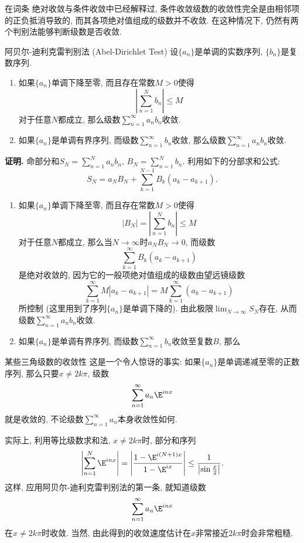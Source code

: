 

在词条 绝对收敛与条件收敛中已经解释过, 条件收敛级数的收敛性完全是由相邻项的正负抵消导致的, 而其各项绝对值组成的级数并不收敛. 在这种情况下, 仍然有两个判别法能够判断级数是否收敛.

\begin{theorem}{阿贝尔-迪利克雷判别法 (Abel-Dirichlet Test)}
设$\{a_n\}$是单调的实数序列, $\{b_n\}$是复数序列.

\begin{enumerate}
\item 如果$\{a_n\}$单调下降至零, 而且存在常数$M>0$使得
$$
\left|\sum_{n=1}^N b_n\right|\leq M
$$
对于任意$N$都成立, 那么级数$\sum_{n=1}^\infty a_nb_n$收敛.

\item 如果$\{a_n\}$是单调有界序列, 而级数$\sum_{n=1}^\infty b_n$收敛, 那么级数$\sum_{n=1}^\infty a_nb_n$收敛.
\end{enumerate}
\end{theorem}

\textbf{证明.} 命部分和$S_N=\sum_{n=1}^N a_nb_n$, $B_N=\sum_{n=1}^N b_n$. 利用如下的分部求和公式:
$$
S_N=a_NB_N+\sum_{k=1}^{N-1}B_k(a_{k}-a_{k+1}).
$$

\begin{enumerate}
\item 如果$\{a_n\}$单调下降至零, 而且存在常数$M>0$使得
$$
|B_N|=\left|\sum_{n=1}^N b_n\right|\leq M
$$
对于任意$N$都成立, 那么当$N\to\infty$时$a_NB_N\to0$, 而级数
$$
\sum_{k=1}^{\infty}B_k(a_{k}-a_{k+1})
$$
是绝对收敛的, 因为它的一般项绝对值组成的级数由望远镜级数
$$
\sum_{k=1}^{\infty}M|a_{k}-a_{k+1}|
=M\sum_{k=1}^{\infty}(a_{k}-a_{k+1})
$$
所控制 (这里用到了序列$\{a_n\}$是单调下降的). 由此极限$\lim_{N\to\infty}S_N$存在, 从而级数$\sum_{n=1}^\infty a_nb_n$收敛.

\item 如果$\{a_n\}$是单调有界序列, 而级数$\sum_{n=1}^\infty b_n$收敛至复数$B$, 那么
\end{enumerate}

\begin{example}{某些三角级数的收敛性}
这是一个令人惊讶的事实: 如果$\{a_n\}$是单调递减至零的正数序列, 那么只要$x\neq 2k\pi$, 级数
$$
\sum_{n=1}^\infty a_n \E^{inx}
$$
就是收敛的, 不论级数$\sum_{n=1}^\infty a_n$本身收敛性如何.

实际上, 利用等比级数求和法, $x\neq 2k\pi$时, 部分和序列
$$
\left|\sum_{n=1}^N\E^{inx}\right|
=\left|\frac{1-\E^{i(N+1)x}}{1-\E^{ix}}\right|
\leq\frac{1}{\left|\sin\frac{x}{2}\right|}.
$$
这样, 应用阿贝尔-迪利克雷判别法的第一条, 就知道级数
$$
\sum_{n=1}^\infty a_n \E^{inx}
$$
在$x\neq 2k\pi$时收敛. 当然, 由此得到的收敛速度估计在$x$非常接近$2k\pi$时会非常粗糙.
\end{example}